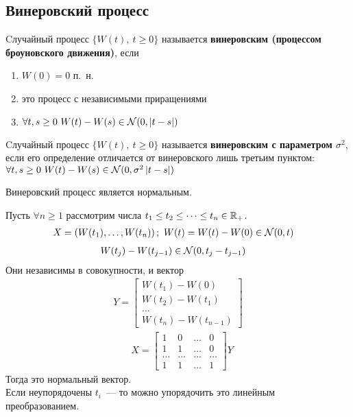 \subsection{Винеровский процесс}
\begin{Def}
    Cлучайный процесс $\{W(t), \ t \geq 0\}$ называется \textbf{винеровским
      (процессом броуновского движения)}, если
    \begin{enumerate}
        \item $W(0) = 0$ п.~н.
        \item это процесс с независимыми приращениями
        \item $\forall t, s \geq 0 \ W(t) - W(s) \in \mathcal{N}(0, \left| t-s \right|)$
    \end{enumerate}
\end{Def}
\begin{Def}
    Cлучайный процесс $\{W(t), \ t \geq 0\}$ называется \textbf{винеровским с
      параметром $\sigma^2$}, если его определение отличается от винеровского
    лишь третьим пунктом:
    \\
    $\forall t, s \geq 0 \ W(t) - W(s) \in \mathcal{N}(0, \sigma^2 \left| t-s \right|)$
\end{Def}
\begin{theorem}
    Винеровский процесс является нормальным.
\end{theorem}
\begin{Proof}
    Пусть $\forall n \geq 1$ рассмотрим числа $t_1\leq t_2\leq \dots \leq t_n
    \in \mathbb{R}_+$.
     \begin{align*}
      & X = \left(W(t_1), \dots, W(t_n)\right); \ W(t) = W(t) - W(0) \in \mathcal{N}(0, t)
     \end{align*}
      \begin{align*}
      & W(t_j) - W(t_{j-1}) \in \mathcal{N}(0, t_j-t_{j-1})
      \end{align*}
      Они независимы в совокупности, и вектор
      \begin{align*}
        Y = \left[ \begin{matrix}
                W(t_1) - W(0) \\
                W(t_2) - W(t_1) \\
                \dots \\
                W(t_n) - W(t_{n-1})
            \end{matrix} \right]
      \end{align*} 
    \begin{align*}
      & X =\left[ \begin{matrix}
              1 & 0 & \dots & 0 \\
              1 & 1 & \dots & 0 \\
              \dots & \dots & \dots & \dots \\
              1 & 1 & \dots & 1
          \end{matrix} \right] Y
    \end{align*}
    Тогда это нормальный вектор.
    \\
    Если неупорядочены $t_i$~--- то можно упорядочить это линейным преобразованием.
\end{Proof}
